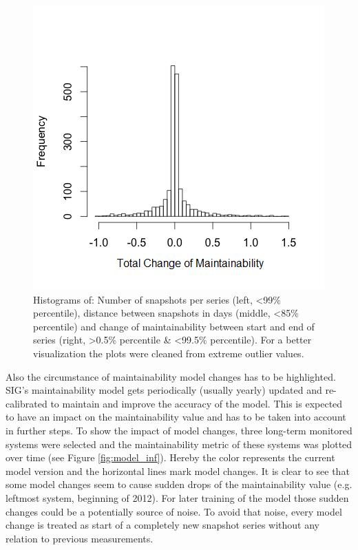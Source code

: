 \begin{figure}[htb]
\begin{minipage}{.45\linewidth}
\end{minipage}
\begin{minipage}{.45\linewidth}
\centering
\includegraphics[width=\linewidth]{figs/Rplot__tval.png}
\end{minipage}
\caption{Histograms of: Number of snapshots per series (left, \textless99\% percentile), distance between snapshots in days (middle, \textless85\% percentile) and change of maintainability between start and end of series (right, \textgreater0.5\% percentile \& \textless99.5\% percentile). For a better visualization the plots were cleaned from extreme outlier values.}
\label{fig:series_1}
\end{figure}
 
Also the circumstance of maintainability model changes has to be highlighted. SIG's maintainability model gets periodically (usually yearly) updated and re-calibrated to maintain and improve the accuracy of the model. This is expected to have an impact on the maintainability value and has to be taken into account in further steps. To show the impact of model changes, three long-term monitored systems were selected and the maintainability metric of these systems was plotted over time (see Figure \ref{fig:model_inf}). Hereby the color represents the current model version and the horizontal lines mark model changes. It is clear to see that some model changes seem to cause sudden drops of the maintainability value (e.g. leftmost system, beginning of 2012). For later training of the model those sudden changes could be a potentially source of noise. To avoid that noise, every model change is treated as start of a completely new snapshot series without any relation to previous measurements.

